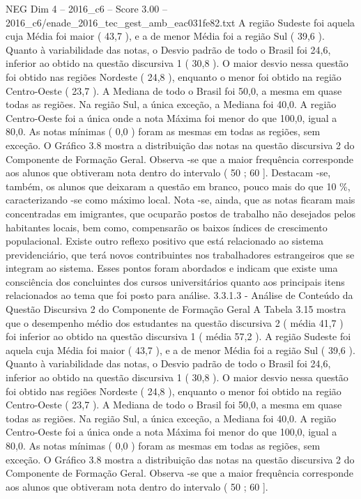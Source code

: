 \begin{textsample}{NEG Dim 4 – 2016\_c6 – Score 3.00 – 2016\_c6/enade\_2016\_tec\_gest\_amb\_eac031fe82.txt}
A região Sudeste foi aquela cuja Média foi maior ( 43,7 ), e a de menor Média foi a região Sul ( 39,6 ).
Quanto à variabilidade das notas, o Desvio padrão de todo o Brasil foi 24,6, inferior ao obtido na questão discursiva 1 ( 30,8 ).
O maior desvio nessa questão foi obtido nas regiões Nordeste ( 24,8 ), enquanto o menor foi obtido na região Centro-Oeste ( 23,7 ).
A Mediana de todo o Brasil foi 50,0, a mesma em quase todas as regiões.
Na região Sul, a única exceção, a Mediana foi 40,0.
A região Centro-Oeste foi a única onde a nota Máxima foi menor do que 100,0, igual a 80,0.
As notas mínimas ( 0,0 ) foram as mesmas em todas as regiões, sem exceção.
O Gráfico 3.8 mostra a distribuição das notas na questão discursiva 2 do Componente de Formação Geral.
Observa -se que a maior frequência corresponde aos alunos que obtiveram nota dentro do intervalo ( 50 ; 60 ].
Destacam -se, também, os alunos que deixaram a questão em branco, pouco mais do que 10 \%, caracterizando -se como máximo local.
Nota -se, ainda, que as notas ficaram mais concentradas em imigrantes, que ocuparão postos de trabalho não desejados pelos habitantes locais, bem como, compensarão os baixos índices de crescimento populacional.
Existe outro reflexo positivo que está relacionado ao sistema previdenciário, que terá novos contribuintes nos trabalhadores estrangeiros que se integram ao sistema.
Esses pontos foram abordados e indicam que existe uma consciência dos concluintes dos cursos universitários quanto aos principais itens relacionados ao tema que foi posto para análise. 3.3.1.3 - Análise de Conteúdo da Questão Discursiva 2 do Componente de Formação Geral A Tabela 3.15 mostra que o desempenho médio dos estudantes na questão discursiva 2 ( média 41,7 ) foi inferior ao obtido na questão discursiva 1 ( média 57,2 ).
A região Sudeste foi aquela cuja Média foi maior ( 43,7 ), e a de menor Média foi a região Sul ( 39,6 ).
Quanto à variabilidade das notas, o Desvio padrão de todo o Brasil foi 24,6, inferior ao obtido na questão discursiva 1 ( 30,8 ).
O maior desvio nessa questão foi obtido nas regiões Nordeste ( 24,8 ), enquanto o menor foi obtido na região Centro-Oeste ( 23,7 ).
A Mediana de todo o Brasil foi 50,0, a mesma em quase todas as regiões.
Na região Sul, a única exceção, a Mediana foi 40,0.
A região Centro-Oeste foi a única onde a nota Máxima foi menor do que 100,0, igual a 80,0.
As notas mínimas ( 0,0 ) foram as mesmas em todas as regiões, sem exceção.
O Gráfico 3.8 mostra a distribuição das notas na questão discursiva 2 do Componente de Formação Geral.
Observa -se que a maior frequência corresponde aos alunos que obtiveram nota dentro do intervalo ( 50 ; 60 ].

\end{textsample}
